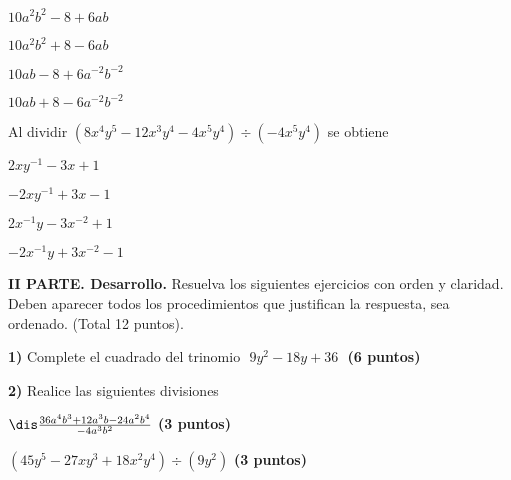 \documentclass[12pt, fleqn]{article}
\begin{document}
\benu
\item[] \opc $10a^2b^2-8+6ab$ \vp
\item[] \opc $10a^2b^2+8-6ab$ \vp
\item[] \opc $10ab-8+6a^{-2}b^{-2}$ \vp
\item[] \opc $10ab+8-6a^{-2}b^{-2}$
\eenu
\vs

\item Al dividir $(8x^4y^5-12x^3y^4-4x^5y^4)\div (-4x^5y^4)$ se obtiene
\vp

\benu
\item[] \opc $2xy^{-1}-3x+1$ \vp
\item[] \opc $-2xy^{-1}+3x-1$ \vp
\item[] \opc $2x^{-1}y-3x^{-2}+1$ \vp
\item[] \opc $-2x^{-1}y+3x^{-2}-1$
\eenu
\eenu

\pagebreak

{\bf II PARTE. Desarrollo.} Resuelva los siguientes ejercicios con orden y claridad. Deben aparecer todos los procedimientos que justifican la respuesta, sea ordenado. (Total 12 puntos). \vp

{\bf 1)} Complete el cuadrado del trinomio $\,\,9y^2-18y+36\,\,$ \hfill {\bf (6 puntos)}

\vs\vs\vs\vs\vs\vs\vs\vs\vs\vs\vs\vs\vs\vs\vs\vs\vs\vs

{\bf 2)} Realice las siguientes divisiones 

\benu
\item $\dis\frac{36a^4b^3+12a^3b-24a^2b^4}{-4a^3b^2}$ \hfill {\bf (3 puntos)}

\vs\vs\vs\vs\vs\vs\vs\vs\vs

\item $(45y^5-27xy^3+18x^2y^4)\div(9y^2)$ \hfill {\bf (3 puntos)}
\eenu
\end{document}
